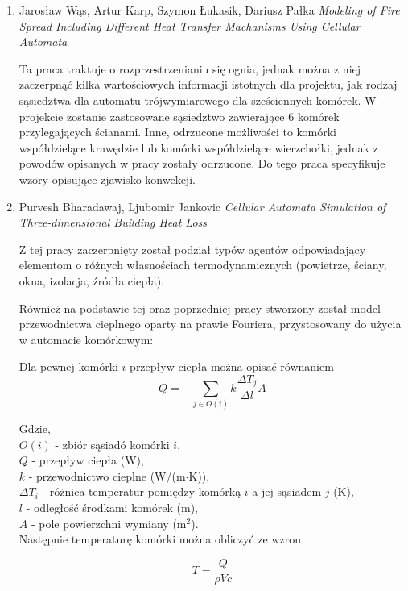 \documentclass{article}
\begin{document}
\begin{enumerate}
    \item
    Jarosław Wąs, Artur Karp, Szymon Łukasik, Dariusz Pałka \textit{Modeling of Fire Spread Including Different 
    Heat Transfer Machanisms Using Cellular Automata}

    Ta praca traktuje o rozprzestrzenianiu się ognia, jednak można z niej zaczerpnąć kilka wartościowych informacji
    istotnych dla projektu, jak rodzaj sąsiedztwa dla automatu trójwymiarowego dla sześciennych komórek. 
    W projekcie zostanie zastosowane sąsiedztwo zawierające 6 komórek przylegających ścianami. Inne, odrzucone możliwości
    to komórki współdzielące krawędzie lub komórki współdzielące wierzchołki, jednak z powodów opisanych w pracy zostały odrzucone. 
    Do tego praca specyfikuje wzory opisujące zjawisko konwekcji.

    \item
    Purvesh Bharadawaj, Ljubomir Jankovic \textit{Cellular Automata Simulation of Three-dimensional Building Heat Loss}

    Z tej pracy zaczerpnięty został podział typów agentów odpowiadający elementom o różnych własnościach termodynamicznych 
    (powietrze, ściany, okna, izolacja, źródła ciepła).

    Również na podstawie tej oraz poprzedniej pracy stworzony został model przewodnictwa cieplnego oparty na prawie Fouriera,
    przystosowany do użycia w automacie komórkowym:

    Dla pewnej komórki $i$ przepływ ciepła można opisać równaniem
    \begin{equation}
    \displaystyle Q=-\sum_{j \in O(i)}k\frac{\Delta T_j}{\Delta l}A
    \end{equation}

    Gdzie,\\
    $O(i)$ - zbiór sąsiadó komórki $i$, \\
    $Q$ - przepływ ciepła (W), \\
    $k$ - przewodnictwo cieplne (W/(m$\cdot$K)), \\
    $\Delta T_i$ - różnica temperatur pomiędzy komórką $i$ a jej sąsiadem $j$ (K), \\
    $l$ - odległość środkami komórek (m), \\
    $A$ - pole powierzchni wymiany (m$^2$). \\
    
    Następnie temperaturę komórki można obliczyć ze wzrou

    \begin{equation}
    T=\frac{Q}{\rho V c}
    \end{equation}


\end{enumerate}
\end{document}
